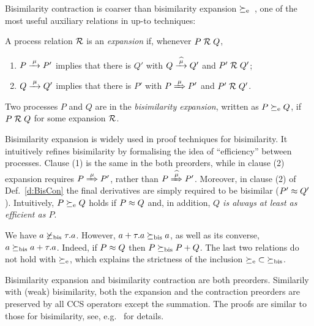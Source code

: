 Bisimilarity contraction is coarser than bisimilarity expansion
$\mathrel{\succeq_{\rm{e}}}$~\cite{arun1992efficiency,sangiorgi2015equations}, one of the
most useful auxiliary relations in up-to techniques:
\begin{definition}[expansion]
\label{d:expa}
A process relation ${{\cal R}}$
  is an \emph{expansion} if, whenever $P\mathrel{\cal R} Q$,
 \begin{enumerate}
 \item   $P \arr\mu P'$ implies that there is $Q'$ with $Q \arcap \mu  Q'$
  and $P' \mathrel{\cal R} Q'$;
 \item $Q \arr\mu Q'$ implies that there is $P'$ with $P \Arr \mu P'$ and $P' \mathrel{\cal R} Q'$.
 \end{enumerate}
Two processes $P$ and $Q$ are in the \emph{bisimilarity
  expansion}, written as $P \mathrel{\succeq_{\rm{e}}} Q$, if $P \mathrel{\cal R} Q$ for some expansion ${\cal R}$.
 \end{definition}
Bisimilarity expansion is widely used in proof techniques for bisimilarity.
It intuitively refines bisimilarity by 
formalising the idea of ``efficiency'' between processes.
Clause (1) is the same in the both preorders, while in clause (2) expansion requires
$P \Arr \mu P'$, rather than $P \Arcap \mu P'$.
Moreover, in clause (2) of Def.~\ref{d:BisCon} the final derivatives
are simply required to be bisimilar ($P' \approx Q'$).
Intuitively, $P \mathrel{\succeq_{\rm{e}}} Q$ holds if $P\approx Q$ and, in addition, \emph{$Q$
  is always at least as efficient as $P$}.

\begin{example}
\label{exa:contr}
We have %
 $ a \not  \mathrel{\succeq_{\rm{bis}}} \tau. a$. However,
$a+ \tau . a \mathrel{\succeq_{\rm{bis}}} a$, as well as its converse, 
$  a \mathrel{\succeq_{\rm{bis}}} a +
\tau . a $. Indeed, if $P \approx Q$ then 
$  P  \mathrel{\succeq_{\rm{bis}}} P +Q$. The last two relations do not hold with 
$\mathrel{\succeq_{\rm{e}}}$, which explains the strictness of the inclusion
 ${\mathrel{\succeq_{\rm{e}}}} \subset {\mathrel{\succeq_{\rm{bis}}}}$. 
\end{example} 

Bisimilarity expansion and bisimilarity contraction are both preorders.
Similarily with (weak) bisimilarity, both the expansion and the
contraction preorders are preserved by all CCS operators except the
summation. The proofs are similar to those for bisimilarity,
see, e.g.~\cite{sangiorgi2017equations} for details.

